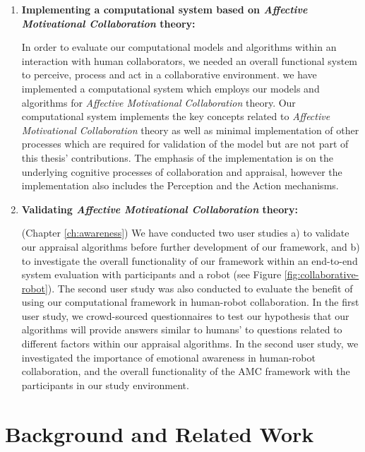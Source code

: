 \documentclass[12pt]{report}
\begin{document}
\begin{enumerate}
  \item \textbf{Implementing a computational system based on \textit{Affective
  Motivational Collaboration} theory:}

  In order to evaluate our computational models and algorithms within an
  interaction with human collaborators, we needed an overall functional system
  to perceive, process and act in a collaborative environment. we have
  implemented a computational system which employs our models and algorithms for
  \textit{Affective Motivational Collaboration} theory. Our computational system
  implements the key concepts related to \textit{Affective Motivational
  Collaboration} theory as well as minimal implementation of other processes
  which are required for validation of the model but are not part of this
  thesis' contributions. The emphasis of the implementation is on the underlying
  cognitive processes of collaboration and appraisal, however the implementation
  also includes the Perception and the Action mechanisms.

  \item \textbf{Validating \textit{Affective Motivational Collaboration}
  theory:}

  (Chapter \ref{ch:awareness}) We have conducted two user studies a) to validate
  our appraisal algorithms before further development of our framework, and b)
  to investigate the overall functionality of our framework within an end-to-end
  system evaluation with participants and a robot (see Figure
  \ref{fig:collaborative-robot}). The second user study was also conducted to
  evaluate the benefit of using our computational framework in human-robot
  collaboration. In the first user study, we crowd-sourced questionnaires to
  test our hypothesis that our algorithms will provide answers similar to
  humans' to questions related to different factors within our appraisal
  algorithms. In the second user study, we investigated the importance of
  emotional awareness in human-robot collaboration, and the overall
  functionality of the AMC framework with the participants in our study
  environment.
\end{enumerate}

\chapter{Background and Related Work}
\label{ch:background}

\vspace*{-5mm}
\end{document}
